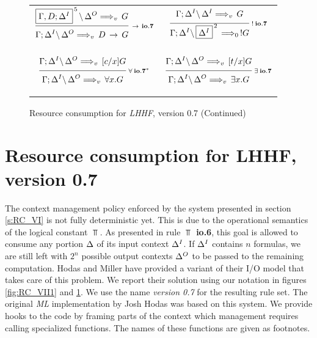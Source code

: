 \begin{figure}[t]
\begin{center}
\begin{tabular}{|cc|}
      $\ruleI
        {\ioVII{\fb{\G,D;\D^I}{5}}{\D^O}{G}{v}}
        {\ioVII{\G;\D^I}{\D^O}{D \Imp G}{v}}
        {\Imp \: io.7}$
      &
      $\ruleI
        {\ioVII{\G;\D^I}{\D^I}{G}{v}}
        {\ioVII{\G;\D^I}{\fb{\D^I}{2}}{!G}{0}}
        {! \: io.7}$
      \\&\\&\\

      $\ruleI
        {\ioVII{\G;\D^I}{\D^O}{[c/x]G}{v}}
        {\ioVII{\G;\D^I}{\D^O}{\A x. G}{v}}
        {\A \: io.7^*}$
      &
      $\ruleI
        {\ioVII{\G;\D^I}{\D^O}{[t/x]G}{v}}
        {\ioVII{\G;\D^I}{\D^O}{\E x. G}{v}}
        {\E \: io.7}$
      \\&\\
      \hline
    \end{tabular}

    \caption{Resource consumption for {\em LHHF}, version 0.7 (Continued)}
    \label{fig:RC_VII2}
  \end{center}
\end{figure}
\hspace*{1em}



\newpage
\section{Resource consumption for LHHF,  version 0.7}
\label{s:RC_VII}

The context management policy enforced by the system presented in section
\ref{s:RC_VI} is not fully deterministic yet. This is due to the operational
semantics of the logical constant $\Top$. As presented in rule {\bf $\Top$
  io.6}, this goal is allowed to consume any portion $\Delta$ of its input
context $\Delta^I$. If $\Delta^I$ contains $n$ formulas, we are still left with $2^n$
possible output contexts $\Delta^O$ to be passed to the remaining computation.
Hodas and Miller \cite{HoM94} have provided a variant of their I/O model that
takes care of this problem. We report their solution using our notation in
figures \ref{fig:RC_VII1} and \ref{fig:RC_VII2}. We use the name {\em version
  0.7\/} for the resulting rule set. The original {\em ML\/} implementation
by Josh Hodas was based on this system. We provide hooks to the code by
framing parts of the context which management requires calling specialized
functions. The names of these functions are given as footnotes.

